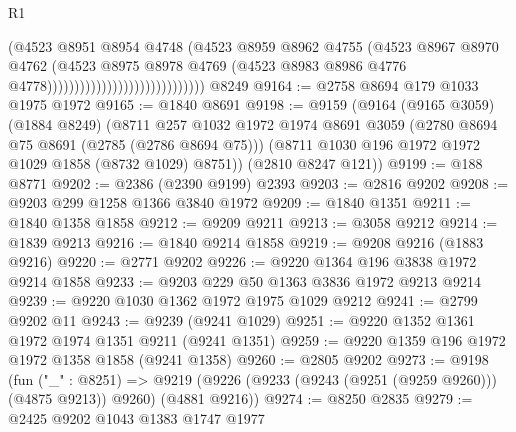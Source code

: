 \begin{lexlean}{R1}
\begin{coremodule}
                                                    (@4523
                                                      @8951
                                                      @8954
                                                      @4748
                                                      (@4523
                                                        @8959
                                                        @8962
                                                        @4755
                                                        (@4523
                                                          @8967
                                                          @8970
                                                          @4762
                                                          (@4523
                                                            @8975
                                                            @8978
                                                            @4769
                                                            (@4523
                                                              @8983
                                                              @8986
                                                              @4776
                                                              @4778)))))))))))))))))))))))))))))
    @8249
@9164 := @2758 @8694 @179 @1033 @1975 @1972
@9165 := @1840 @8691
@9198 := @9159
    (@9164
      (@9165 @3059)
      (@1884 @8249)
      (@8711
        @257
        @1032
        @1972
        @1974
        @8691
        @3059
        (@2780 @8694 @75 @8691 (@2785 (@2786 @8694 @75)))
        (@8711 @1030 @196 @1972 @1972 @1029 @1858 (@8732 @1029) @8751))
      (@2810 @8247 @121))
@9199 := @188 @8771
@9202 := @2386 (@2390 @9199) @2393
@9203 := @2816 @9202
@9208 := @9203 @299 @1258 @1366 @3840 @1972
@9209 := @1840 @1351
@9211 := @1840 @1358 @1858
@9212 := @9209 @9211
@9213 := @3058 @9212
@9214 := @1839 @9213
@9216 := @1840 @9214 @1858
@9219 := @9208 @9216 (@1883 @9216)
@9220 := @2771 @9202
@9226 := @9220 @1364 @196 @3838 @1972 @9214 @1858
@9233 := @9203 @229 @50 @1363 @3836 @1972 @9213 @9214
@9239 := @9220 @1030 @1362 @1972 @1975 @1029 @9212
@9241 := @2799 @9202 @11
@9243 := @9239 (@9241 @1029)
@9251 := @9220 @1352 @1361 @1972 @1974 @1351 @9211 (@9241 @1351)
@9259 := @9220 @1359 @196 @1972 @1972 @1358 @1858 (@9241 @1358)
@9260 := @2805 @9202
@9273 := @9198
    (fun ("_" : @8251) =>
    @9219 (@9226 (@9233 (@9243 (@9251 (@9259 @9260))) (@4875 @9213)) @9260) (@4881 @9216))
@9274 := @8250 @2835
@9279 := @2425 @9202 @1043 @1383 @1747 @1977

\end{coremodule}
\end{lexlean}
